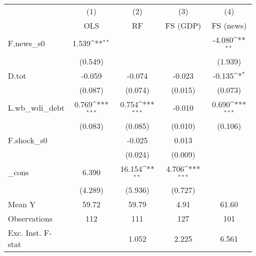 {
\def\sym#1{\ifmmode^{#1}\else\(^{#1}\)\fi}
\begin{tabular}{l*{4}{c}}
\toprule
            &\multicolumn{1}{c}{(1)}&\multicolumn{1}{c}{(2)}&\multicolumn{1}{c}{(3)}&\multicolumn{1}{c}{(4)}\\
            &\multicolumn{1}{c}{OLS}&\multicolumn{1}{c}{RF}&\multicolumn{1}{c}{FS (GDP)}&\multicolumn{1}{c}{FS (news)}\\
\midrule
F.news\_s0   &       1.539\sym{**} &                     &                     &      -4.080\sym{**} \\
            &     (0.549)         &                     &                     &     (1.939)         \\
\addlinespace
D.tot       &      -0.059         &      -0.074         &      -0.023         &      -0.135\sym{*}  \\
            &     (0.087)         &     (0.074)         &     (0.015)         &     (0.073)         \\
\addlinespace
L.wb\_wdi\_debt&       0.769\sym{***}&       0.754\sym{***}&      -0.010         &       0.690\sym{***}\\
            &     (0.083)         &     (0.085)         &     (0.010)         &     (0.106)         \\
\addlinespace
F.shock\_s0  &                     &      -0.025         &       0.013         &                     \\
            &                     &     (0.024)         &     (0.009)         &                     \\
\addlinespace
\_cons      &       6.390         &      16.154\sym{**} &       4.706\sym{***}&                     \\
            &     (4.289)         &     (5.936)         &     (0.727)         &                     \\
\midrule
Mean Y      &       59.72         &       59.79         &        4.91         &       61.60         \\
Observations&         112         &         111         &         127         &         101         \\
Exc. Inst. F-stat&                     &       1.052         &       2.225         &       6.561         \\
\bottomrule
\end{tabular}
}
